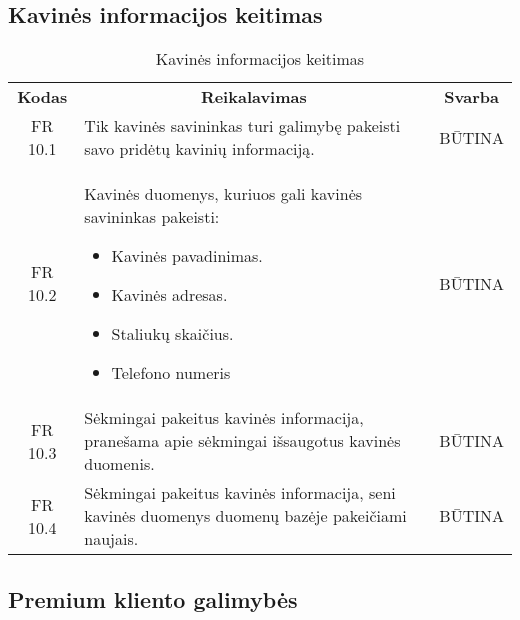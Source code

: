 \documentclass{VUMIFPSkursinis}
\begin{document}
\subsection{Kavinės informacijos keitimas}
\begin{center}
	\begin{table}[H]
	\begin{tabular}{|p{2cm}|p{}|p{}|}
	\hline
	    \rowcolor{lightgray}
		\multicolumn{3}{|c|}{Kavinės informacijos keitimas}\\
		
	\hline
		\multicolumn{1}{|c|}{{\bfseries Kodas}}&
		\multicolumn{1}{|c|}{{\bfseries Reikalavimas}}&
		\multicolumn{1}{|c|}{{\bfseries Svarba}}\\
	\hline 	
		\multicolumn{1}{|c|}{FR 10.1}&
		{Tik kavinės savininkas turi galimybę pakeisti savo pridėtų kavinių informaciją.}&
		\multicolumn{1}{|c|}{BŪTINA}\\
	
	\hline 	
		\multicolumn{1}{|c|}{FR 10.2}&
		{Kavinės duomenys, kuriuos gali kavinės savininkas pakeisti:
		\begin{itemize}
			\item Kavinės pavadinimas.
			\item Kavinės adresas.
			\item Staliukų skaičius.
			\item Telefono numeris
		\end{itemize}}&
		\multicolumn{1}{|c|}{BŪTINA}\\
	
	\hline 	
		\multicolumn{1}{|c|}{FR 10.3}&
		{Sėkmingai pakeitus kavinės informacija, pranešama apie sėkmingai išsaugotus kavinės duomenis.}&
		\multicolumn{1}{|c|}{BŪTINA}\\
	
	\hline 	
		\multicolumn{1}{|c|}{FR 10.4}&
		{Sėkmingai pakeitus kavinės informacija, seni kavinės duomenys duomenų bazėje pakeičiami naujais.}&
		\multicolumn{1}{|c|}{BŪTINA}\\
	
	\hline  
	
	
	\end{tabular}
	\caption{Kavinės informacijos keitimas}
	\label{table:Kavinėsinformacijoskeitimas}	
	\end{table}

\end{center}

\subsection{Premium kliento galimybės}
\end{document}
